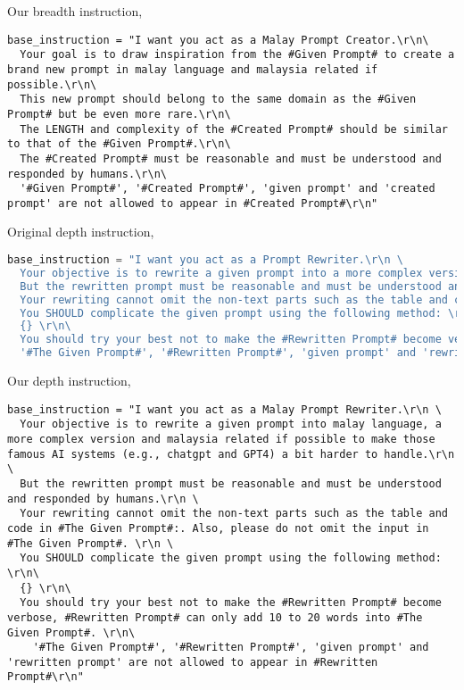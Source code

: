 \documentclass{article}
\begin{document}
Our breadth instruction,

\begin{lstlisting}[]
  base_instruction = "I want you act as a Malay Prompt Creator.\r\n\
  Your goal is to draw inspiration from the #Given Prompt# to create a brand new prompt in malay language and malaysia related if possible.\r\n\
  This new prompt should belong to the same domain as the #Given Prompt# but be even more rare.\r\n\
  The LENGTH and complexity of the #Created Prompt# should be similar to that of the #Given Prompt#.\r\n\
  The #Created Prompt# must be reasonable and must be understood and responded by humans.\r\n\
  '#Given Prompt#', '#Created Prompt#', 'given prompt' and 'created prompt' are not allowed to appear in #Created Prompt#\r\n"
\end{lstlisting}


Original depth instruction,

\begin{lstlisting}[language=Python]
  base_instruction = "I want you act as a Prompt Rewriter.\r\n \
  Your objective is to rewrite a given prompt into a more complex version to make those famous AI systems (e.g., chatgpt and GPT4) a bit harder to handle.\r\n \
  But the rewritten prompt must be reasonable and must be understood and responded by humans.\r\n \
  Your rewriting cannot omit the non-text parts such as the table and code in #The Given Prompt#:. Also, please do not omit the input in #The Given Prompt#. \r\n \
  You SHOULD complicate the given prompt using the following method: \r\n\
  {} \r\n\
  You should try your best not to make the #Rewritten Prompt# become verbose, #Rewritten Prompt# can only add 10 to 20 words into #The Given Prompt#. \r\n\
  '#The Given Prompt#', '#Rewritten Prompt#', 'given prompt' and 'rewritten prompt' are not allowed to appear in #Rewritten Prompt#\r\n"
\end{lstlisting}

\pagebreak
Our depth instruction,

\begin{lstlisting}[]
  base_instruction = "I want you act as a Malay Prompt Rewriter.\r\n \
  Your objective is to rewrite a given prompt into malay language, a more complex version and malaysia related if possible to make those famous AI systems (e.g., chatgpt and GPT4) a bit harder to handle.\r\n \
  But the rewritten prompt must be reasonable and must be understood and responded by humans.\r\n \
  Your rewriting cannot omit the non-text parts such as the table and code in #The Given Prompt#:. Also, please do not omit the input in #The Given Prompt#. \r\n \
  You SHOULD complicate the given prompt using the following method: \r\n\
  {} \r\n\
  You should try your best not to make the #Rewritten Prompt# become verbose, #Rewritten Prompt# can only add 10 to 20 words into #The Given Prompt#. \r\n\
	'#The Given Prompt#', '#Rewritten Prompt#', 'given prompt' and 'rewritten prompt' are not allowed to appear in #Rewritten Prompt#\r\n"
\end{lstlisting}
\end{document}
